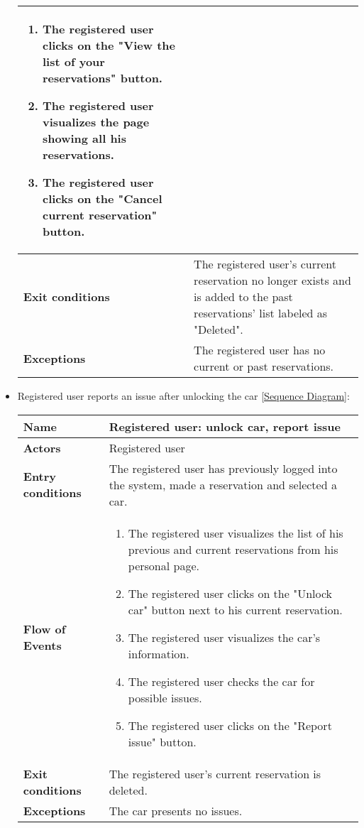 \begin{itemize}
\begin{table}[H]
\begin{tabular}{| m{3.5cm} | m{9.5cm} |}
\begin{enumerate}
			\item The registered user clicks on the "View the list of your reservations" button.
			\item The registered user visualizes the page showing all his reservations.
			\item The registered user clicks on the "Cancel current reservation" button.
		\end{enumerate} \\
		\hline
		\textbf{Exit conditions} & The registered user's current reservation no longer exists and is added to the past reservations' list labeled as "Deleted".\\
		\hline
		\textbf{Exceptions} & The registered user has no current or past reservations.\\
		\hline
	\end{tabular}
\end{table}
\newpage
\item Registered user reports an issue after unlocking the car [\hyperlink{ReportIssue}{Sequence Diagram}]:
\begin{table}[H]
	\centering
	\begin{tabular}{| m{3.5cm} | m{9.5cm} |}
		\hline
		\textbf{Name} & Registered user: unlock car, report issue\\
		\hline
		\textbf{Actors} & Registered user\\
		\hline
		\textbf{Entry conditions} & The registered user has previously logged into the system, made a reservation and selected a car.\\
		\hline
		\textbf{Flow of Events} & 
		\begin{enumerate}
			\item The registered user visualizes the list of his previous and current reservations from his personal page.
			\item The registered user clicks on the "Unlock car" button next to his current reservation.
			\item The registered user visualizes the car's information.
			\item The registered user checks the car for possible issues.
			\item The registered user clicks on the "Report issue" button.   
		\end{enumerate} \\
		\hline
		\textbf{Exit conditions} & The registered user's current reservation is deleted.\\
		\hline
		\textbf{Exceptions} & The car presents no issues.\\

\end{tabular}
\end{table}
\end{itemize}
